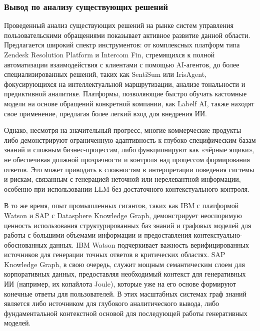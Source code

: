 \subsubsection{Вывод по анализу существующих решений}

Проведенный анализ существующих решений на рынке систем управления пользовательскими обращениями показывает активное развитие данной области. Предлагается широкий спектр инструментов: от комплексных платформ типа Zendesk Resolution Platform и Intercom Fin, стремящихся к полной автоматизации взаимодействия с клиентами с помощью AI-агентов, до более специализированных решений, таких как SentiSum или IrisAgent, фокусирующихся на интеллектуальной маршрутизации, анализе тональности и предиктивной аналитике. Платформы, позволяющие быстро обучать кастомные модели на основе обращений конкретной компании, как Labelf AI, также находят свое применение, предлагая более легкий вход для внедрения ИИ.

Однако, несмотря на значительный прогресс, многие коммерческие продукты либо демонстрируют ограниченную адаптивность к глубоко специфическим базам знаний и сложным бизнес-процессам, либо функционируют как «чёрные ящики», не обеспечивая должной прозрачности и контроля над процессом формирования ответов. Это может приводить к сложностям в интерпретации поведения системы и рискам, связанным с генерацией неточной или нерелевантной информации, особенно при использовании LLM без достаточного контекстуального контроля.

В то же время, опыт промышленных гигантов, таких как IBM с платформой Watson и SAP с Datasphere Knowledge Graph, демонстрирует неоспоримую ценность использования структурированных баз знаний и графовых моделей для работы с большими объемами информации и предоставления контекстуально-обоснованных данных. IBM Watson подчеркивает важность верифицированных источников для генерации точных ответов в критических областях. SAP Knowledge Graph, в свою очередь, служит мощным семантическим слоем для корпоративных данных, предоставляя необходимый контекст для генеративных ИИ (например, их копайлота Joule), которые уже на его основе формируют конечные ответы для пользователей. В этих масштабных системах граф знаний является либо источником для глубокого аналитического вывода, либо фундаментальной контекстной основой для последующей работы генеративных моделей.

